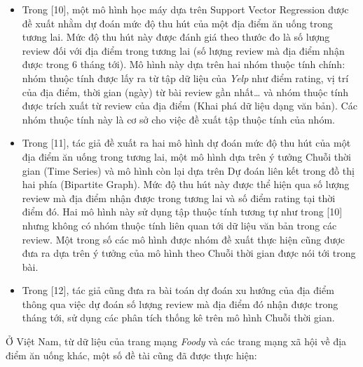 \documentclass[12pt]{extarticle}
\begin{document}
\begin{itemize}
				\item Trong [10], một mô hình học máy dựa trên Support Vector Regression được đề xuất nhằm dự đoán mức độ thu hút của một địa điểm ăn uống trong tương lai. Mức độ thu hút này được đánh giá theo thước đo là số lượng review đối với địa điểm trong tương lai (số lượng review mà địa điểm nhận được trong 6 tháng tới). Mô hình này dựa trên hai nhóm thuộc tính chính: nhóm thuộc tính được lấy ra từ tập dữ liệu của \textit{Yelp} như điểm rating, vị trí của địa điểm, thời gian (ngày) từ bài review gần nhất… và nhóm thuộc tính được trích xuất từ review của địa điểm (Khai phá dữ liệu dạng văn bản). Các nhóm thuộc tính này là cơ sở cho việc đề xuất tập thuộc tính của nhóm.
				\item Trong [11], tác giả đề xuất ra hai mô hình dự đoán mức độ thu hút của một địa điểm ăn uống trong tương lai, một mô hình dựa trên ý tưởng Chuỗi thời gian (Time Series) và mô hình còn lại dựa trên Dự đoán liên kết trong đồ thị hai phía (Bipartite Graph). Mức độ thu hút này được thể hiện qua số lượng review mà địa điểm nhận được trong tương lai và số điểm rating tại thời điểm đó. Hai mô hình này sử dụng tập thuộc tính tương tự như trong [10] nhưng không có nhóm thuộc tính liên quan tới dữ liệu văn bản trong các review. Một trong số các mô hình được nhóm đề xuất thực hiện cũng được đưa ra dựa trên ý tưởng của mô hình theo Chuỗi thời gian được nói tới trong bài. 
				\item Trong [12], tác giả cũng đưa ra bài toán dự đoán xu hướng của địa điểm thông qua việc dự đoán số lượng review mà địa điểm đó nhận được trong tháng tới, sử dụng các phân tích thống kê trên mô hình Chuỗi thời gian.
			\end{itemize}
			\par Ở Việt Nam, từ dữ liệu của trang mạng \textit{Foody}  và các trang mạng xã hội về địa điểm ăn uống khác, một số đề tài cũng đã được thực hiện:
\end{document}
